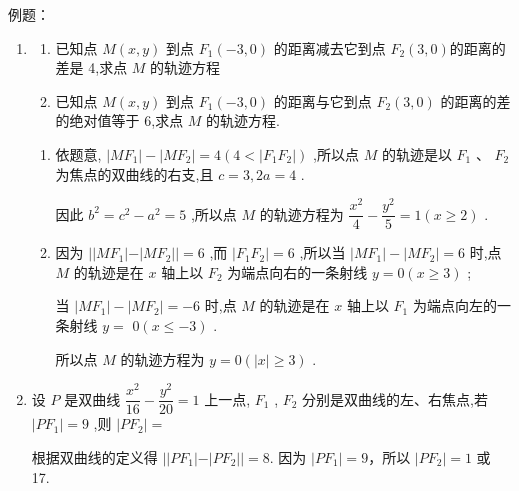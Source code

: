例题：
\begin{enumerate}
    \item 
    \begin{enumerate}
        \item 已知点 $M\left( {x,y}\right)$ 到点 ${F}_{1}\left( {-3,0}\right)$ 的距离减去它到点 ${F}_{2} (3,0)$的距离的差是 4,求点 $M$ 的轨迹方程
        
        \item 已知点 $M\left( {x,y}\right)$ 到点 ${F}_{1}\left( {-3,0}\right)$ 的距离与它到点 ${F}_{2}\left( {3,0}\right)$ 的距离的差的绝对值等于 6,求点 $M$ 的轨迹方程.
    \end{enumerate}
    \begin{jieda}
    \begin{enumerate}
        \item 依题意, $\left| {M{F}_{1}}\right|  - \left| {M{F}_{2}}\right|  = 4\left( {4 < \left| {{F}_{1}{F}_{2}}\right| }\right)$ ,所以点 $M$ 的轨迹是以 ${F}_{1}\text{ 、 }{F}_{2}$ 为焦点的双曲线的右支,且 $c = 3,{2a} = 4$ .
        
        因此 ${b}^{2} = {c}^{2} - {a}^{2} = 5$ ,所以点 $M$ 的轨迹方程为 $\dfrac{{x}^{2}}{4} - \dfrac{{y}^{2}}{5} = 1\left( {x \geq  2}\right)$ .
        \item 因为 $\left| \right| M{F}_{1}\left| -\right| M{F}_{2}\left| \right|  = 6$ ,而 $\left| {{F}_{1}{F}_{2}}\right|  = 6$ ,所以当 $\left| {M{F}_{1}}\right|  - \left| {M{F}_{2}}\right|  = 6$ 时,点 $M$ 的轨迹是在 $x$ 轴上以 ${F}_{2}$ 为端点向右的一条射线 $y = 0\left( {x \geq  3}\right)$ ;
        
        当 $\left| {M{F}_{1}}\right|  - \left| {M{F}_{2}}\right|  =  - 6$ 时,点 $M$ 的轨迹是在 $x$ 轴上以 ${F}_{1}$ 为端点向左的一条射线 $y =$  $0\left( {x \leq   - 3}\right)$ .
        
        所以点 $M$ 的轨迹方程为 $y = 0\left( {\left| x\right|  \geq  3}\right)$ .
    \end{enumerate}
    \end{jieda}
    \item 设 $P$ 是双曲线 $\dfrac{{x}^{2}}{16} - \dfrac{{y}^{2}}{20} = 1$ 上一点, ${F}_{1}$ , ${F}_{2}$ 分别是双曲线的左、右焦点,若 $\left| {P{F}_{1}}\right|  = 9$ ,则 $\left| {P{F}_{2}}\right|  =$ 
    
    \begin{jieda}
        根据双曲线的定义得 $||P{F}_{1}| - |P{F}_{2}||= 8$. 因为 $\left| {P{F}_{1}}\right|  = 9$，所以 $\left| {P{F}_{2}}\right|  = 1$ 或 17.
        

\end{jieda}
\end{enumerate}
